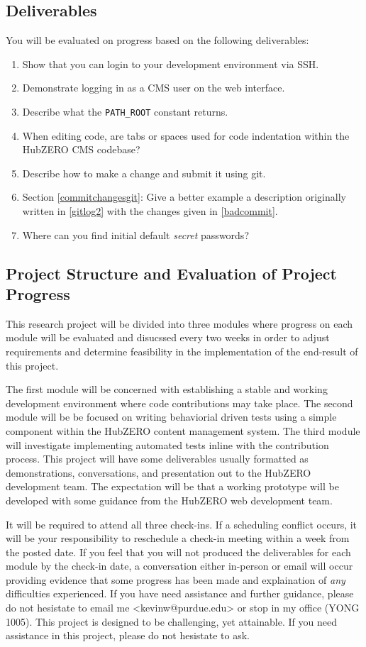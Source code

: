 \documentclass[10pt,letterpaper,titlepage]{article}
\begin{document}
\subsection{Deliverables}
You will be evaluated on progress based on the following deliverables: 
\begin{enumerate}
\item Show that you can login to your development environment via SSH.
\item Demonstrate logging in as a CMS user on the web interface.
\item Describe what the \texttt{PATH\_ROOT} constant returns.
\item When editing code, are tabs or spaces used for code indentation within the HubZERO CMS codebase?
\item Describe how to make a change and submit it using git.
\item Section \ref{commitchangesgit}: Give a better example a description originally written in \ref{gitlog2} with the changes given in \ref{badcommit}.
\item Where can you find initial default \emph{secret} passwords?
\end{enumerate}

\subsection{Project Structure and Evaluation of Project Progress}
This research project will be divided into three modules where progress on each module will be evaluated and disucssed every two weeks in order to adjust requirements and determine feasibility in the implementation of the end-result of this project. 

The first module will be concerned with establishing a stable and working development environment where code contributions may take place.  The second module will be be focused on writing behaviorial driven tests using a simple component within the HubZERO content management system.  The third module will investigate implementing automated tests inline with the contribution process. This project will have some deliverables usually formatted as demonstrations, conversations, and presentation out to the HubZERO development team. The expectation will be that a working prototype will be developed with some guidance from the HubZERO web development team. 

It will be required to attend all three check-ins. If a scheduling conflict occurs, it will be your responsibility to reschedule a check-in meeting within a week from the posted date. If you feel that you will not produced the deliverables for each module by the check-in date, a conversation either in-person or email will occur providing evidence that some progress has been made and explaination of \emph{any} difficulties experienced.
If you have need assistance and further guidance, please do not hesistate to email me <kevinw@purdue.edu> or stop in my office (YONG 1005).  This project is designed to be challenging, yet attainable. If you need assistance in this project, please do not hesistate to ask. 
\end{document}
